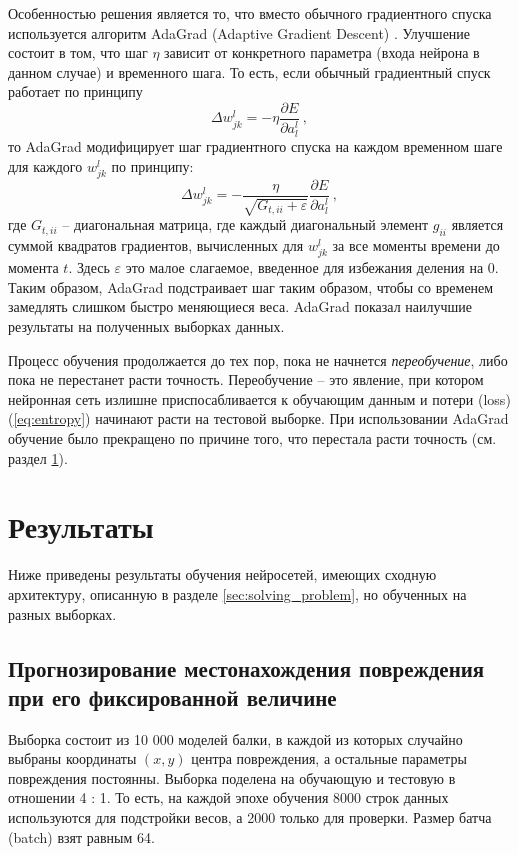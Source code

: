 \documentclass[a4paper,12pt]{article}
\theoremstyle{remark}
\begin{document}
 	Особенностью решения является то, что вместо обычного градиентного спуска используется алгоритм AdaGrad (Adaptive Gradient Descent) \cite{adagrad}. Улучшение состоит в том, что шаг $\eta$ зависит от конкретного параметра (входа нейрона в данном случае) и временного шага. То есть, если обычный градиентный спуск работает по принципу
 	\begin{equation}
 		\Delta w_{jk}^l = - \eta \frac{\partial E}{\partial a_l^l}\ ,
 	\end{equation}
 	то AdaGrad модифицирует шаг градиентного спуска на каждом временном шаге для каждого $w_{jk}^l$ по принципу:
 	\begin{equation}
 		\Delta w_{jk}^l = - \frac{\eta}{\sqrt{G_{t,ii} + \varepsilon}} \frac{\partial E}{\partial a_l^l}\ ,
 	\end{equation}
 	где $G_{t,ii}$ -- диагональная матрица, где каждый диагональный элемент $g_{ii}$ является суммой квадратов градиентов, вычисленных для $w_{jk}^l$ за все моменты времени до момента $t$. Здесь $\varepsilon$ это малое слагаемое, введенное для избежания деления на 0. Таким образом, AdaGrad подстраивает шаг таким образом, чтобы со временем замедлять слишком быстро меняющиеся веса. AdaGrad показал наилучшие результаты на полученных выборках данных.
 	
	Процесс обучения продолжается до тех пор, пока не начнется \textit{переобучение}, либо пока не перестанет расти точность. Переобучение -- это явление, при котором нейронная сеть излишне приспосабливается к обучающим данным и потери (loss) (\ref{eq:entropy}) начинают расти на тестовой выборке. При использовании AdaGrad обучение было прекращено по причине того, что перестала расти точность (см. раздел \ref{sec:results}).
	
	\newpage
	\section{Результаты}
	\label{sec:results}
	
	Ниже приведены результаты обучения нейросетей, имеющих сходную архитектуру, описанную в разделе \ref{sec:solving_problem}, но обученных на разных выборках.
	
	\subsection{Прогнозирование местонахождения повреждения при его фиксированной величине}
	\label{sec:results_location}
	
	Выборка состоит из 10 000 моделей балки, в каждой из которых случайно выбраны координаты $(x, y)$ центра повреждения, а остальные параметры повреждения постоянны. Выборка поделена на обучающую и тестовую в отношении 4 : 1. То есть, на каждой эпохе обучения 8000 строк данных используются для подстройки весов, а 2000 только для проверки. Размер батча (batch) взят равным 64.
	
\end{document}
